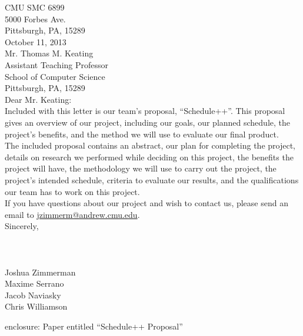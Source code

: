 \thispagestyle{empty}
CMU SMC 6899\\
5000 Forbes Ave.\\
Pittsburgh, PA, 15289\\


October 11, 2013\\


Mr. Thomas M. Keating\\
Assistant Teaching Professor\\
School of Computer Science\\
Pittsburgh, PA, 15289\\


Dear Mr. Keating:\\


Included with this letter is our team's proposal, ``Schedule++''. This proposal
gives an overview of our project, including our goals, our planned schedule,
the project's benefits, and the method we will use to evaluate our final
product.\\


The included proposal contains an abstract, our plan for completing the project,
details on research we performed while deciding on this project, the benefits
the project will have, the methodology we will use to carry out the project, the
project's intended schedule, criteria to evaluate our results, and the
qualifications our team has to work on this project.\\


If you have questions about our project and wish to contact us, please send an
email to \href{mailto:jzimmerm@andrew.cmu.edu}{jzimmerm@andrew.cmu.edu}.\\


Sincerely,\\
\\
\\
\\
Joshua Zimmerman\\
Maxime Serrano\\
Jacob Naviasky\\
Chris Williamson

\vfill

enclosure: Paper entitled ``Schedule++ Proposal''
\newpage

